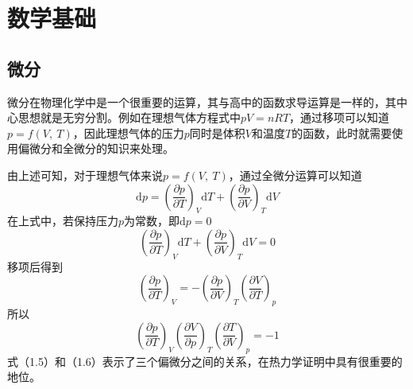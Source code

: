 \documentclass[lang=cn,newtx,10pt,scheme=chinese]{elegantbook}
\begin{document}
\section{数学基础}
\subsection{微分}
微分在物理化学中是一个很重要的运算，其与高中的函数求导运算是一样的，其中心思想就是无穷分割。例如在理想气体方程式中$pV=nRT$，通过移项可以知道$p=f(V, \ T)$，因此理想气体的压力$p$同时是体积$V$和温度$T$的函数，此时就需要使用偏微分和全微分的知识来处理。

由上述可知，对于理想气体来说$p=f(V, \ T)$，通过全微分运算可以知道
\begin{equation}
	\mathrm{d}p=\left ( \frac{\partial p}{\partial T}  \right )_V\mathrm{d}T +\left ( \frac{\partial p}{\partial V}  \right )_T\mathrm{d}V
\end{equation}
在上式中，若保持压力$p$为常数，即$\mathrm{d}p=0$
\begin{equation}
	\left ( \frac{\partial p}{\partial T}  \right )_V\mathrm{d}T +\left ( \frac{\partial p}{\partial V}  \right )_T\mathrm{d}V=0
\end{equation}
移项后得到
\begin{equation}
	\left ( \frac{\partial p}{\partial T}  \right )_V=-\left ( \frac{\partial p}{\partial V}  \right )_T\left ( \frac{\partial V}{\partial T}  \right )_p  
\end{equation}
所以
\begin{equation}
	\left ( \frac{\partial p}{\partial T}  \right )_V \left ( \frac{\partial V}{\partial p}  \right )_T \left ( \frac{\partial T}{\partial V}  \right )_p = -1
\end{equation}
式（1.5）和（1.6）表示了三个偏微分之间的关系，在热力学证明中具有很重要的地位。
\end{document}
